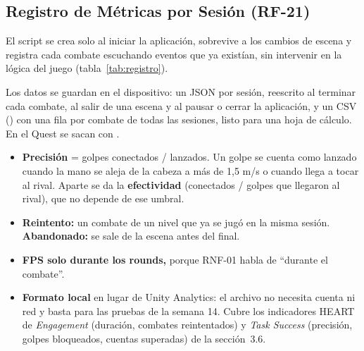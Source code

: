 \subsection{Registro de Métricas por Sesión (RF-21)}
\label{sec:registro}
El script  se crea solo al iniciar la aplicación, sobrevive a los cambios de escena y registra cada combate escuchando eventos que ya existían, sin intervenir en la lógica del juego (tabla~\ref{tab:registro}).

\begin{table}[H]
\centering
\caption{Datos registrados por combate.}
\label{tab:registro}
\end{table}

Los datos se guardan en el dispositivo: un JSON por sesión, reescrito al terminar cada combate, al salir de una escena y al pausar o cerrar la aplicación, y un CSV () con una fila por combate de todas las sesiones, listo para una hoja de cálculo. En el Quest se sacan con .

\begin{itemize}
  \item \textbf{Precisión} = golpes conectados / lanzados. Un golpe se cuenta como lanzado cuando la mano se aleja de la cabeza a más de 1,5 m/s o cuando llega a tocar al rival. Aparte se da la \textbf{efectividad} (conectados / golpes que llegaron al rival), que no depende de ese umbral.
  \item \textbf{Reintento:} un combate de un nivel que ya se jugó en la misma sesión. \textbf{Abandonado:} se sale de la escena antes del final.
  \item \textbf{FPS solo durante los rounds,} porque RNF-01 habla de ``durante el combate''.
  \item \textbf{Formato local} en lugar de Unity Analytics: el archivo no necesita cuenta ni red y basta para las pruebas de la semana 14. Cubre los indicadores HEART de \emph{Engagement} (duración, combates reintentados) y \emph{Task Success} (precisión, golpes bloqueados, cuentas superadas) de la sección~3.6.
\end{itemize}


